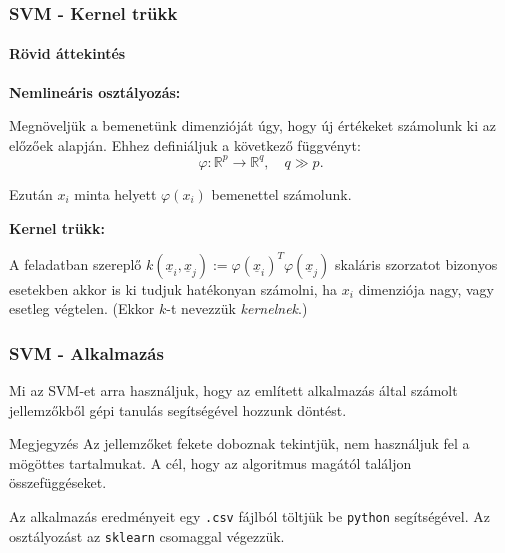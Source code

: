 \documentclass[11pt]{beamer}
\begin{document}
\begin{frame}
	\frametitle{SVM - Kernel trükk}
	\framesubtitle{Rövid áttekintés}
	\textbf{Nemlineáris osztályozás:}
	
	Megnöveljük a bemenetünk dimenzióját úgy, hogy új értékeket számolunk ki az előzőek alapján. Ehhez definiáljuk a következő függvényt:
	\[
	\varphi\colon \mathbb{R}^p \rightarrow \mathbb{R}^q, \quad q \gg p.
	\]
	
	Ezután $ x_i $ minta helyett $ \varphi(x_i) $ bemenettel számolunk.
	
	\textbf{Kernel trükk: }
	
	A feladatban szereplő $ k(\underline{x}_i, \underline{x}_j) := \varphi(\underline{x}_i)^T \varphi(\underline{x}_j) $ skaláris szorzatot bizonyos esetekben akkor is ki tudjuk hatékonyan számolni, ha $ x_i $ dimenziója nagy, vagy esetleg végtelen. (Ekkor $ k $-t nevezzük \textit{kernelnek}.)
	


\end{frame}

%	
%	
%
%		
%
%


\begin{frame}
	\frametitle{SVM - Alkalmazás}
	
	Mi az SVM-et arra használjuk, hogy az említett alkalmazás által számolt jellemzőkből gépi tanulás segítségével hozzunk döntést.
	\begin{block}{Megjegyzés}
		Az jellemzőket fekete doboznak tekintjük, nem használjuk fel a mögöttes tartalmukat. A cél, hogy az algoritmus magától találjon összefüggéseket.
	\end{block}

	Az alkalmazás eredményeit egy \texttt{.csv} fájlból töltjük be \texttt{python} segítségével. Az osztályozást az \texttt{sklearn} csomaggal végezzük.

\end{frame}
\end{document}
